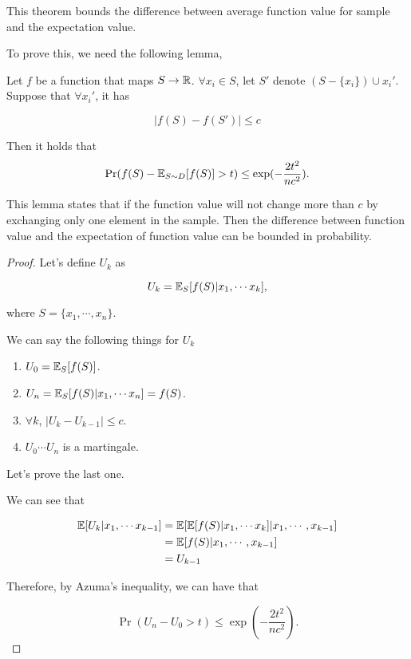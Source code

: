 \documentclass[../main.tex]{subfiles}
\begin{document}
	This theorem bounds the difference between average function value for sample and the expectation value.
	
	To prove this, we need the following lemma,
	
	\begin{lemma}\label{mc_ineq}
		Let $f$ be a function that maps $S\to \mathbb{R}$. $\forall x_i \in S$, let $S'$ denote $(S - \{x_i\}) \cup x_i'$. Suppose that $\forall x_i'$, it has 
		
		\begin{equation*}
			|f(S) - f(S')| \leq c
		\end{equation*}
		
		Then it holds that 
		\begin{equation}
		\Pr(f(S) - \mathbb{E}_{S\sim D} [f(S)] > t) \leq \exp(-\frac{2t^2}{nc^2}).
		\end{equation}
	\end{lemma}

	This lemma states that if the function value will not change more than $c$ by exchanging only one element in the sample. Then the difference between function value and the expectation of function value can be bounded in probability.
	
	\begin{proof}
		Let's define $U_k$ as 
		
		\begin{equation*}
			U_k = \mathbb{E}_S [f(S)|x_1, \cdots x_k],
		\end{equation*}
		
		where $S =\{x_1, \cdots, x_n\}$.
		
		We can say the following things for $U_k$
		
		\begin{enumerate}
			\item $U_0 = \mathbb{E}_S [f(S)]$.
			\item $U_n = \mathbb{E}_S [f(S) | x_1,\cdots x_n] = f(S)$.
			\item $\forall k$, $|U_k - U_{k-1}| \leq c$.
			\item $U_0\cdots U_n$ is a martingale.
		\end{enumerate}
	
		Let's prove the last one.
		
		We can see that
		
		\begin{equation*}
			\begin{aligned}
				\mathbb{E}[U_k | x_1,\cdots x_{k-1}] & = \mathbb{E}[\mathbb{E}[f(S) | x_1,\cdots x_k] | x_1,\cdots, x_{k-1}]  \\
											  & = \mathbb{E}[f(S) | x_1,\cdots, x_{k-1}]\\
											  & = U_{k-1}
			\end{aligned}
		\end{equation*}
		
		Therefore, by Azuma's inequality, we can have that 
		
		\begin{equation*}
			\Pr(U_n - U_0 > t) \leq \exp(-\frac{2t^2}{nc^2}).
		\end{equation*}
	\end{proof}
\end{document}
